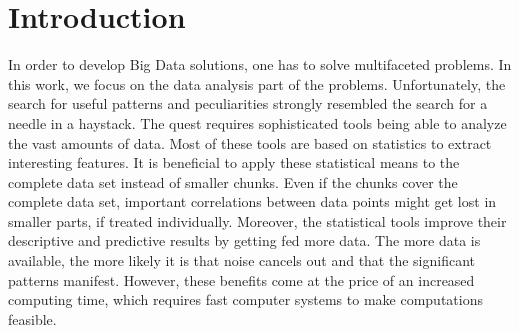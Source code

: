 \section{Introduction}

In order to develop Big Data solutions, one has to solve multifaceted problems. %
In this work, we focus on the data analysis part of the problems. Unfortunately, the search for useful patterns and peculiarities strongly resembled the search for a needle in a haystack. The quest requires sophisticated tools being able to analyze the vast amounts of data. Most of these tools are based on statistics to extract interesting features. It is beneficial to apply these statistical means to the complete data set instead of smaller chunks. Even if the chunks cover the complete data set, important correlations between data points might get lost in smaller parts, if treated individually. Moreover, the statistical tools improve their descriptive and predictive results by getting fed more data. The more data is available, the more likely it is that noise cancels out and that the significant patterns manifest. However, these benefits come at the price of an increased computing time, which requires fast computer systems to make computations feasible. 
